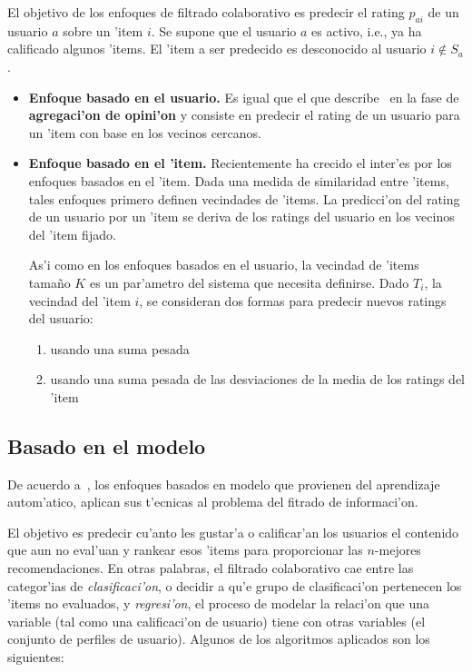 \documentclass[11pt]{article}
\begin{document}
El objetivo de los enfoques de filtrado colaborativo es predecir el rating $p_{ai}$ de un usuario $a$ sobre un 'item $i$. Se supone que el usuario $a$ es activo, i.e., ya ha calificado algunos 'items. El 'item a ser predecido es desconocido al usuario $i \notin S_{a}$.

\begin{itemize}
\item \textbf{Enfoque basado en el usuario.} Es igual que el que describe~\cite{recsys:nlathia} en la fase de \textbf{agregaci'on de opini'on} y consiste en predecir el rating de un usuario para un 'item con base en los vecinos cercanos.

\item \textbf{Enfoque basado en el 'item.} Recientemente ha crecido el inter'es por los enfoques basados en el 'item. Dada una medida de similaridad entre 'items, tales enfoques primero definen vecindades de 'items. La predicci'on del rating de un usuario por un 'item se deriva de los ratings del usuario en los vecinos del 'item fijado.

As'i como en los enfoques basados en el usuario, la vecindad de 'items tama\~{n}o $K$ es un par'ametro del sistema que necesita definirse. Dado $T_i$, la vecindad del 'item $i$, se consideran dos formas para predecir nuevos ratings del usuario:

\begin{enumerate}
\item usando una suma pesada
\item usando una suma pesada de las desviaciones de la media de los ratings del 'item
\end{enumerate}
\end{itemize}


\subsection{Basado en el modelo}
De acuerdo a~\cite{recsys:nlathia}, los enfoques basados en modelo que provienen del aprendizaje autom'atico, aplican sus t'ecnicas al problema del fitrado de informaci'on.

El objetivo es predecir cu'anto les gustar'a o calificar'an los usuarios el contenido que aun no eval'uan y rankear esos 'items para proporcionar las $n$-mejores recomendaciones. En otras palabras, el filtrado colaborativo cae entre las categor'ias de \textit{clasificaci'on}, o decidir a qu'e grupo de clasificaci'on pertenecen los 'items no evaluados, y \textit{regresi'on}, el proceso de modelar la relaci'on que una variable (tal como una calificaci'on de usuario) tiene con otras variables (el conjunto de perfiles de usuario). Algunos de los algoritmos aplicados son los siguientes:
\end{document}
